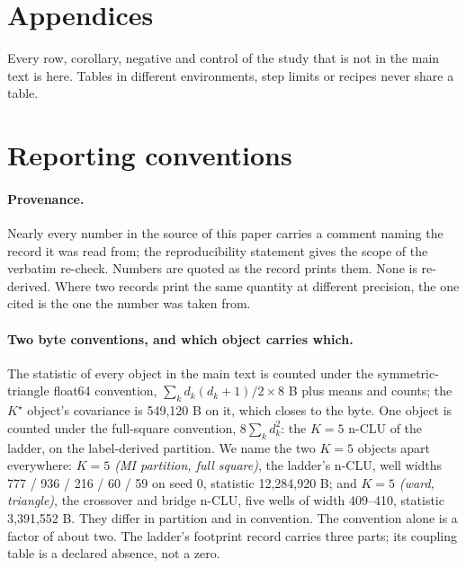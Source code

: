 \documentclass{article} %
\newcommand{\Kstar}{\ensuremath{K^{\star}}}
\begin{document}
\clearpage
\appendix
\section*{Appendices}
Every row, corollary, negative and control of the study that
is not in the main text is here. Tables in different environments,
step limits or recipes never share a table.

\section{Reporting conventions}
\label{app:conventions}

\paragraph{Provenance.} Nearly every number in the source of this paper carries a comment naming
the record it was read from; the reproducibility statement gives the scope of the verbatim re-check. Numbers are quoted as the record prints them. None is re-derived.
Where two records print the same quantity at different precision, the one cited is the one the
number was taken from.

\paragraph{Two byte conventions, and which object carries which.} The statistic of every object
in the main text is counted under the symmetric-triangle float64 convention,
$\sum_k d_k(d_k+1)/2\times8$ B plus means and counts; the $\Kstar$ object's covariance is
549,120 B on it, which closes to the byte. %
One object is counted under the full-square convention, $8\sum_k d_k^2$: the $K=5$ n-CLU of the
ladder, on the label-derived partition. We name the two $K=5$ objects apart everywhere:
\emph{$K=5$ (MI partition, full square)}, the ladder's n-CLU, well widths 777 / 936 / 216 / 60 /
59 on seed 0, statistic 12,284,920 B; and \emph{$K=5$ (ward, triangle)}, the crossover and
bridge n-CLU, five wells of width 409--410, statistic 3,391,552 B. They differ in partition and
in convention. The convention alone is a factor of about two.
The ladder's footprint record carries three parts; its coupling table is a declared absence, not a
zero. %
\end{document}
